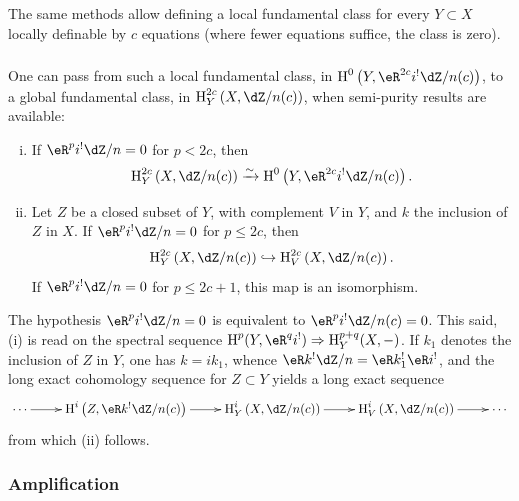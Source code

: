 \subsubsection{}\label{IV:2-2-4}

The same methods allow defining a local fundamental class
for every $Y\subset X$ locally definable by $c$ equations (where
fewer equations suffice, the class is zero).




\subsubsection{}\label{IV:2-2-5}

One can pass from such a local fundamental class, in
$\h^0\left(Y,\eR^{2 c} i^!\dZ/n(c)\right)$, to a global fundamental class,
in $\h_Y^{2 c}\left(X,\dZ/n(c)\right)$, when semi-purity results are
available:




\begin{proposition}\label{IV:2-2-6}
\begin{enumerate}[(i)]
  \item If $\eR^p i^!\dZ/n=0$ for $p<2 c$, then
    \[
      \h_Y^{2 c}\left(X,\dZ/n(c)\right) \iso \h^0\left(Y,\eR^{2 c} i^! \dZ/n(c)\right) \text{.}
    \]
  \item Let $Z$ be a closed subset of $Y$, with complement $V$ in $Y$, and
    $k$ the inclusion of $Z$ in $X$. If $\eR^p i^! \dZ/n = 0$ for
    $p\leqslant 2 c$, then
    \[
      \h_Y^{2 c}\left(X,\dZ/n(c)\right) \hookrightarrow \h_V^{2 c}\left(X,\dZ/n(c)\right) \text{.}
    \]
    If $\eR^p i^!\dZ/n=0$ for $p\leqslant 2 c+1$, this map is an
    isomorphism.
\end{enumerate}
\end{proposition}

The hypothesis $\eR^p i^!\dZ/n=0$ is equivalent to $\eR^p i^!\dZ/n(c)=0$. This said,
(i) is read on the spectral sequence
$\h^p(Y,\eR^q i^!)\Rightarrow \h_Y^{p+q}(X,-)$. If $k_1$ denotes the inclusion of $Z$ in
$Y$, one has $k=i k_1$, whence $\eR k^! \dZ/n=\eR k_1^! \eR i^!$, and the long exact
cohomology sequence for $Z\subset Y$ yields a long exact sequence
\[\xymatrix{
  \cdots \ar[r]
    & \h^i\left(Z,\eR k^! \dZ/n(c)\right) \ar[r]
    & \h_Y^i\left(X,\dZ/n(c)\right) \ar[r]
    & \h_V^i\left(X,\dZ/n(c)\right) \ar[r]
    & \cdots
}\]
from which (ii) follows.




\subsubsection{Amplification}\label{IV:2-2-7}


